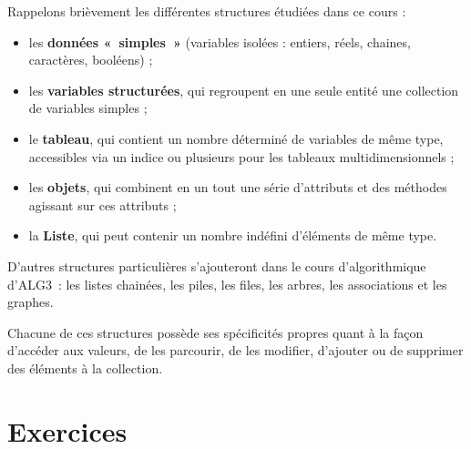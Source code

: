 	Rappelons brièvement les différentes structures étudiées dans ce cours
	 :
	
	\begin{itemize}
		\item 
			les \textbf{données «~simples~»} 
			(variables isolées : entiers, réels, chaines, caractères, booléens) ;
		\item 
			les \textbf{variables structurées}, 
			qui regroupent en une seule entité
			une collection de variables simples ;
		\item 
			le \textbf{tableau}, 
			qui contient un nombre déterminé de variables de même type, 
			accessibles via un indice 
			ou plusieurs pour les tableaux multidimensionnels ;
		\item 
			les \textbf{objets}, 
			qui combinent en un tout une série d’attributs 
			et des méthodes agissant sur ces attributs ;
		\item 
			la \textbf{Liste}, 
			qui peut contenir un nombre indéfini d’éléments de même type.
	\end{itemize}
	
	D’autres structures particulières s’ajouteront 
	dans le cours d'algorithmique d'ALG3~: 
	les listes chainées, les piles, les files, les arbres, les associations et les graphes.
	
	Chacune de ces structures possède ses spécificités propres quant à la
	façon d’accéder aux valeurs, de les parcourir, de les modifier,
	d’ajouter ou de supprimer des éléments à la collection. 

\clearpage
\section{Exercices}

